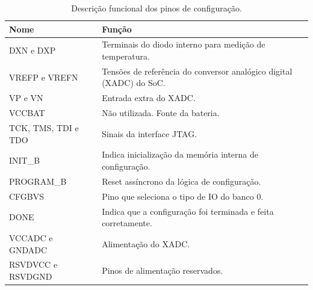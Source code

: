 \begin{table}[H]
	\ABNTEXfontereduzida
	\caption{\label{tab:config}Descrição funcional dos pinos de configuração.}
    \centering
    \begin{tabular}{@{} >{\centering}p{4cm} >{\centering}p{8cm} @{}}
    
		\toprule
		\textbf{Nome} & \textbf{Função} \tabularnewline 
        \midrule
         DXN e DXP & Terminais do diodo interno para medição de temperatura. \tabularnewline
         \midrule

         VREFP e VREFN & Tensões de referência do conversor analógico digital (XADC) do SoC. \tabularnewline

       \midrule
        VP e VN & Entrada extra do XADC. \tabularnewline

       \midrule
        VCCBAT & Não utilizada. Fonte da bateria. \tabularnewline

       \midrule
        TCK, TMS, TDI e TDO & Sinais da interface JTAG.  \tabularnewline

       \midrule
        INIT\_B & Indica inicialização da memória interna de configuração. \tabularnewline

       \midrule
       PROGRAM\_B & Reset assíncrono da lógica de configuração. \tabularnewline

       \midrule
        CFGBVS & Pino que seleciona o tipo de IO do banco 0. \tabularnewline

       \midrule
        DONE & Indica que a configuração foi terminada e feita corretamente. \tabularnewline

       \midrule
        VCCADC e GNDADC & Alimentação do XADC. \tabularnewline

       \midrule
        RSVDVCC e RSVDGND & Pinos de alimentação reservados. \tabularnewline

        \bottomrule
	\end{tabular}
\end{table}


